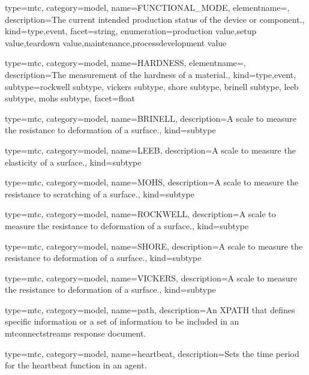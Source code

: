 {
  type=mtc,
  category=model,
  name={FUNCTIONAL\_MODE},
  elementname=,
  description={The current intended production status of the device or component.},
  kind={type,event},
  facet={\gls{string}},
  enumeration={\gls{production value},\gls{setup value},\gls{teardown value},\gls{maintenance},\gls{processdevelopment value}}
}


{
  type=mtc,
  category=model,
  name={HARDNESS},
  elementname=,
  description={The measurement of the hardness of a material.},
  kind={type,event},
  subtype={\gls{rockwell subtype}, \gls{vickers subtype}, \gls{shore subtype}, \gls{brinell subtype}, \gls{leeb subtype}, \gls{mohs subtype}},
  facet={\gls{float}}
}


{
  type=mtc,
  category=model,
  name={BRINELL},
  description={A scale to measure the resistance to deformation of a surface.},
  kind={subtype}
}


{
  type=mtc,
  category=model,
  name={LEEB},
  description={A scale to measure the elasticity of a surface.},
  kind={subtype}
}


{
  type=mtc,
  category=model,
  name={MOHS},
  description={A scale to measure the resistance to scratching of a surface.},
  kind={subtype}
}


{
  type=mtc,
  category=model,
  name={ROCKWELL},
  description={A scale to measure the resistance to deformation of a surface.},
  kind={subtype}
}


{
  type=mtc,
  category=model,
  name={SHORE},
  description={A scale to measure the resistance to deformation of a surface.},
  kind={subtype}
}


{
  type=mtc,
  category=model,
  name={VICKERS},
  description={A scale to measure the resistance to deformation of a surface.},
  kind={subtype}
}

{
  type=mtc,
  category=model,
  name={path},
  description={An XPATH that defines specific information or a set of information to be included in an \gls{mtconnectstreams response document}.}
}

{
  type=mtc,
  category=model,
  name={heartbeat},
  description={Sets the time period for the heartbeat function in an \gls{agent}.}
}


